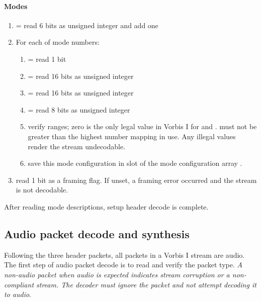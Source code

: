 \paragraph{Modes}

\begin{enumerate}
 \item {} = read 6 bits as unsigned integer and add one
 \item For each of  mode numbers:
  \begin{enumerate}
  \item {} = read 1 bit
  \item {} = read 16 bits as unsigned integer
  \item {} = read 16 bits as unsigned integer
  \item {} = read 8 bits as unsigned integer
  \item verify ranges; zero is the only legal value in Vorbis I for
and .   must not be greater than the highest number mapping in use.  Any illegal values render the stream undecodable.
  \item save this mode configuration in slot \varname{[i]} of the mode configuration array
.
 \end{enumerate}

\item read 1 bit as a framing flag.  If unset, a framing error occurred and the stream is not
decodable.
\end{enumerate}

After reading mode descriptions, setup header decode is complete.








\subsection{Audio packet decode and synthesis}

Following the three header packets, all packets in a Vorbis I stream
are audio.  The first step of audio packet decode is to read and
verify the packet type. \emph{A non-audio packet when audio is expected
indicates stream corruption or a non-compliant stream. The decoder
must ignore the packet and not attempt decoding it to audio}.


